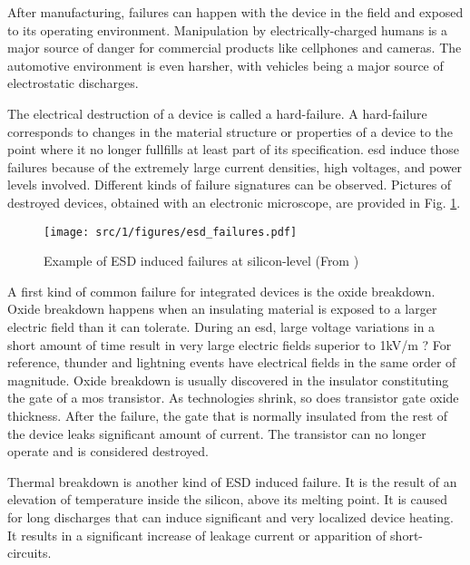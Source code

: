 After manufacturing, failures can happen with the device in the field and exposed to its operating environment.
Manipulation by electrically-charged humans is a major source of danger for commercial products like cellphones and cameras.
The automotive environment is even harsher, with vehicles being a major source of electrostatic discharges.

The electrical destruction of a device is called a hard-failure.
A hard-failure corresponds to changes in the material structure or properties of a device to the point where it no longer fullfills at least part of its specification.
\gls{esd} induce those failures because of the extremely large current densities, high voltages, and power levels involved.
Different kinds of failure signatures can be observed.
Pictures of destroyed devices, obtained with an electronic microscope, are provided in Fig. \ref{fig:silicon-level-failures}.

\begin{figure}[!h]
  \centering
  \texttt{[image: src/1/figures/esd\_failures.pdf]}
  \caption{Example of ESD induced failures at silicon-level (From \cite{esd-robust-product})}
  \label{fig:silicon-level-failures}
\end{figure}


A first kind of common failure for integrated devices is the oxide breakdown.
Oxide breakdown happens when an insulating material is exposed to a larger electric field than it can tolerate.
During an \gls{esd}, large voltage variations in a short amount of time result in very large electric fields superior to 1kV/m ?
For reference, thunder and lightning events have electrical fields in the same order of magnitude.
Oxide breakdown is usually discovered in the insulator constituting the gate of a \gls{mos} transistor.
As technologies shrink, so does transistor gate oxide thickness.
After the failure, the gate that is normally insulated from the rest of the device leaks significant amount of current.
The transistor can no longer operate and is considered destroyed.

Thermal breakdown is another kind of ESD induced failure.
It is the result of an elevation of temperature inside the silicon, above its melting point.
It is caused for long discharges that can induce significant and very localized device heating.
It results in a significant increase of leakage current or apparition of short-circuits.

